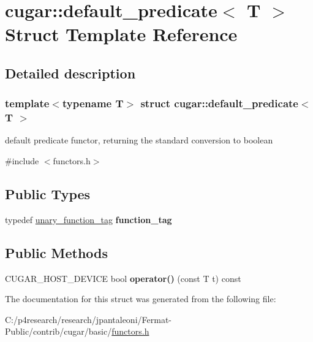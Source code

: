 \hypertarget{structcugar_1_1default__predicate}{}\section{cugar\+:\+:default\+\_\+predicate$<$ T $>$ Struct Template Reference}
\label{structcugar_1_1default__predicate}


\subsection{Detailed description}
\subsubsection*{template$<$typename T$>$\newline
struct cugar\+::default\+\_\+predicate$<$ T $>$}

default predicate functor, returning the standard conversion to boolean 

{\ttfamily \#include $<$functors.\+h$>$}

\subsection*{Public Types}
\begin{DoxyCompactItemize}
\item 
\mbox{\label{structcugar_1_1default__predicate_a16729285cfefa52731333b201939c356}} 
typedef \hyperlink{structcugar_1_1unary__function__tag}{unary\+\_\+function\+\_\+tag} {\bfseries function\+\_\+tag}
\end{DoxyCompactItemize}
\subsection*{Public Methods}
\begin{DoxyCompactItemize}
\item 
\mbox{\label{structcugar_1_1default__predicate_a04d5240eb9900e2645a67fc3aa82e46f}} 
C\+U\+G\+A\+R\+\_\+\+H\+O\+S\+T\+\_\+\+D\+E\+V\+I\+CE bool {\bfseries operator()} (const T t) const
\end{DoxyCompactItemize}


The documentation for this struct was generated from the following file\+:\begin{DoxyCompactItemize}
\item 
C\+:/p4research/research/jpantaleoni/\+Fermat-\/\+Public/contrib/cugar/basic/\hyperlink{functors_8h}{functors.\+h}\end{DoxyCompactItemize}
